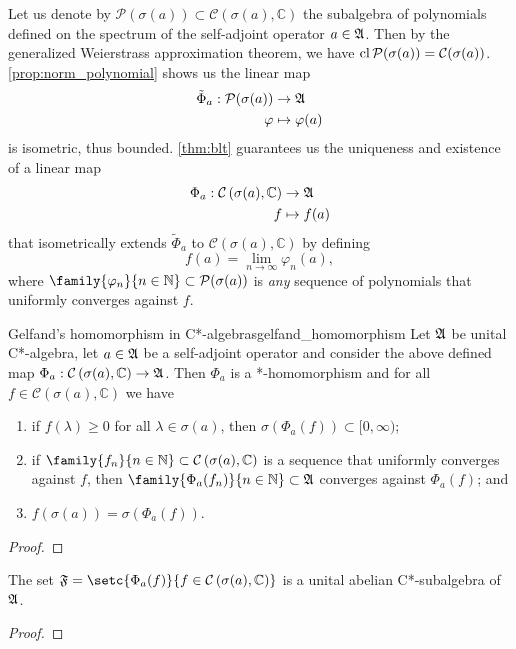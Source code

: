 Let us denote by \(\mathcal{P}(\sigma(a)) \subset \mathcal{C}(\sigma(a), \mathbb{C})\) the subalgebra of polynomials defined on the spectrum of the self-adjoint operator \(a \in \mathfrak{A}\). Then by the generalized Weierstrass approximation theorem, we have \(\operatorname{cl}{\mathcal{P}(\sigma(a))} = \mathcal{C}(\sigma(a))\). \cref{prop:norm_polynomial} shows us the linear map
\begin{align*}
    \tilde{\Phi}_a : \mathcal{P}(\sigma(a)) &\to \mathfrak{A}\\
                                    \varphi &\mapsto \varphi(a)
\end{align*}
is isometric, thus bounded. \cref{thm:blt} guarantees us the uniqueness and existence of a linear map
\begin{align*}
    \Phi_a : \mathcal{C}\left(\sigma(a), \mathbb{C}\right) &\to \mathfrak{A}\\
                                                         f &\mapsto f(a)
\end{align*}
that isometrically extends \(\tilde{\Phi}_a\) to \(\mathcal{C}\left(\sigma(a), \mathbb{C}\right)\) by defining
\begin{equation*}
    f(a) = \lim_{n\to\infty} \varphi_n(a),
\end{equation*}
where \(\family{\varphi_n}{n\in \mathbb{N}} \subset \mathcal{P}(\sigma(a))\) is \emph{any} sequence of polynomials that uniformly converges against \(f\).

\begin{theorem}{Gelfand's homomorphism in C*-algebras}{gelfand_homomorphism}
    Let \(\mathfrak{A}\) be unital C*-algebra, let \(a \in \mathfrak{A}\) be a self-adjoint operator and consider the above defined map \(\Phi_a : \mathcal{C}\left(\sigma(a), \mathbb{C}\right) \to \mathfrak{A}\). Then \(\Phi_a\) is a *-homomorphism and for all \(f \in \mathcal{C}\left(\sigma(a), \mathbb{C}\right)\) we have
    \begin{enumerate}[label=(\alph*)]
        \item if \(f(\lambda) \geq 0\) for all \(\lambda \in \sigma(a)\), then \(\sigma(\Phi_a(f)) \subset [0, \infty)\);
        \item if \(\family{f_n}{n\in \mathbb{N}}\subset \mathcal{C}\left(\sigma(a), \mathbb{C}\right)\) is a sequence that uniformly converges against \(f\), then \(\family{\Phi_a(f_n)}{n\in \mathbb{N}} \subset \algebra{A}\) converges against \(\Phi_a(f)\); and
        \item \(f(\sigma(a)) = \sigma(\Phi_a(f))\).
    \end{enumerate}
\end{theorem}
\begin{proof}

\end{proof}

\begin{corollary}
    The set \(\algebra{F} = \setc{\Phi_a(f)}{f \in \mathcal{C}\left(\sigma(a), \mathbb{C}\right)}\) is a unital abelian C*-subalgebra of \(\mathfrak{A}\).
\end{corollary}
\begin{proof}

\end{proof}

